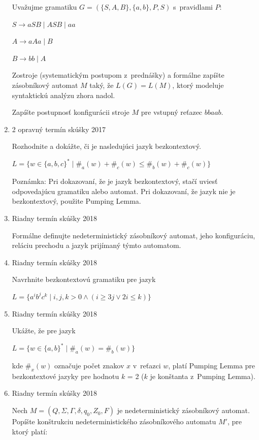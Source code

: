 \documentclass[11pt,a4paper]{article}
\begin{document}
\begin{enumerate}
		Uvažujme gramatiku $G = (\{S,A,B\}, \{a,b\}, P, S)$ s~pravidlami $P$:

		$S \rightarrow aSB \mid ASB \mid aa$

		$A \rightarrow aAa \mid B$

		$B \rightarrow bb \mid A$

		Zostroje (systematickým postupom z~prednášky) a formálne zapíšte zásobníkový automat $M$ taký, že $L(G) = L(M)$, ktorý modeluje syntaktickú analýzu zhora nadol.

		Zapíšte postupnosť konfigurácii stroje $M$ pre vstupný reťazec $bbaab$.

		\item 2 opravný termín skúšky 2017

		Rozhodnite a dokážte, či je nasledujúci jazyk bezkontextový.

		$L = \{w \in \{a,b,c\}^* \mid \#_a(w) + \#_c(w) \leq  \#_b(w) +  \#_c(w)\}$

		Poznámka: Pri dokazovaní, že je jazyk bezkontextový, stačí uviesť odpovedajúcu gramatiku alebo automat. Pri dokazovaní, že jazyk nie je bezkontextový, použite Pumping Lemma.

		\item Riadny termín skúšky 2018

		Formálne definujte nedeterministický zásobníkový automat, jeho konfiguráciu, reláciu prechodu a jazyk prijímaný týmto automatom.

		\item Riadny termín skúšky 2018

		Navrhnite bezkontextovú gramatiku pre jazyk

		$L = \{a^ib^jc^k \mid i,j,k > 0 \land (i \geq 3j \lor 2i \leq k)\}$

		\item Riadny termín skúšky 2018

		Ukážte, že pre jazyk

		$L = \{w \in \{a,b\}^* \mid \#_a(w) = \#_b(w)\}$

		kde $\#_x(w)$ označuje počet znakov $x$ v~reťazci $w$, platí Pumping Lemma pre bezkontextové jazyky pre hodnotu $k$ = 2 ($k$ je konštanta z~Pumping Lemma).

		\item Riadny termín skúšky 2018

		Nech $M = (Q, \Sigma, \Gamma, \delta, q_0, Z_0, F)$ je nedeterministický zásobníkový automat. Popíšte konštrukciu nedeterministického zásobníkového automatu $M'$, pre ktorý platí:


\end{enumerate}
\end{document}
